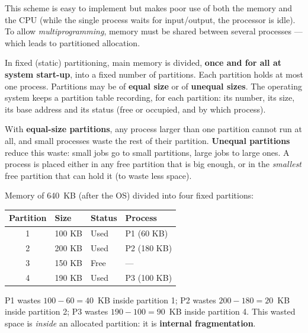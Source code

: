 \documentclass[11pt]{article}
\newcommand{\cle}[1]{{\popxbold\color{popdark}#1}}
\newcounter{popsec}
\newcounter{popsub}
\newcommand{\courssub}[1]{%
  \stepcounter{popsub}%
  \par\vspace{9pt}\noindent{\popxbold\fontsize{11.5}{13}\selectfont\color{popink}{\color{poporange}\thepopsec.\thepopsub}\hspace{6pt}#1}\par\nopagebreak\vspace{4pt}
}
\begin{document}
This scheme is easy to implement but makes poor use of both the memory and the CPU (while the single process waits for input/output, the processor is idle). To allow \emph{multiprogramming}, memory must be shared between several processes — which leads to partitioned allocation.

\courssub{Fixed (Static) Partitioning}

\begin{definition}
In \cle{fixed (static) partitioning}, main memory is divided, \textbf{once and for all at system start-up}, into a fixed number of partitions. Each partition holds at most one process. Partitions may be of \textbf{equal size} or of \textbf{unequal sizes}. The operating system keeps a \cle{partition table} recording, for each partition: its number, its size, its base address and its status (free or occupied, and by which process).
\end{definition}

With \textbf{equal-size partitions}, any process larger than one partition cannot run at all, and small processes waste the rest of their partition. \textbf{Unequal partitions} reduce this waste: small jobs go to small partitions, large jobs to large ones. A process is placed either in any free partition that is big enough, or in the \emph{smallest} free partition that can hold it (to waste less space).

\begin{exemplebox}
Memory of 640~KB (after the OS) divided into four fixed partitions:

\begin{center}
\begin{tabularx}{\linewidth}{|c|X|X|X|}
\hline
\rowcolor{popblueL} \textbf{Partition} & \textbf{Size} & \textbf{Status} & \textbf{Process} \\
\hline
1 & 100 KB & Used & P1 (60 KB) \\
\hline
2 & 200 KB & Used & P2 (180 KB) \\
\hline
3 & 150 KB & Free & --- \\
\hline
4 & 190 KB & Used & P3 (100 KB) \\
\hline
\end{tabularx}
\end{center}

P1 wastes $100-60=40$~KB inside partition 1; P2 wastes $200-180=20$~KB inside partition 2; P3 wastes $190-100=90$~KB inside partition 4. This wasted space is \emph{inside} an allocated partition: it is \textbf{internal fragmentation}.
\end{exemplebox}
\end{document}
